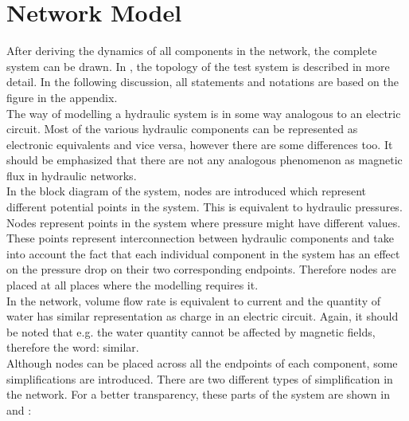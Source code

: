 \section{Network Model}  
\label{SystemModel}

After deriving the dynamics of all components in the network, the complete system can be drawn. In , the topology of the test system is described in more detail. In the following discussion, all statements and notations are based on the figure in the appendix. 
\\
The way of modelling a hydraulic system is in some way analogous to an electric circuit. Most of the various hydraulic components can be represented as electronic equivalents and vice versa, however there are some differences too. It should be emphasized that there are not any analogous phenomenon as magnetic flux in hydraulic networks. 
\\
In the block diagram of the system, nodes are introduced which represent different potential points in the system. This is equivalent to hydraulic pressures. Nodes represent points in the system where pressure might have different values. These points represent interconnection between hydraulic components and take into account the fact that each individual component in the system has an effect on the pressure drop on their two corresponding endpoints. Therefore nodes are placed at all places where the modelling requires it. 
\\
In the network, volume flow rate is equivalent to current and the quantity of water has similar representation as charge in an electric circuit. Again, it should be noted that e.g. the water quantity cannot be affected by magnetic fields, therefore the word: similar.
\\ 
Although nodes can be placed across all the endpoints of each component, some simplifications are introduced. There are two different types of simplification in the network. For a better transparency, these parts of the system are shown in  and : 


\begin{figure}[H]
\centering
\begin{minipage}{0.4\textwidth}
  \centering
   
  \label{fig:subsys_1}
\end{minipage}%
\begin{minipage}{0.4\textwidth}
  \centering
   
  \label{fig:subsys_2}
\end{minipage}
\end{figure}

